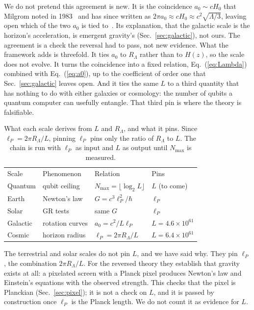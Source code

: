 \documentclass[aps,prd,twocolumn,superscriptaddress,nofootinbib,showkeys]{revtex4-2}
\begin{document}
We do not pretend this agreement is new. It is the coincidence $a_0\sim cH_0$ that Milgrom noted in 1983~\cite{milgrom1983} and has since written as $2\pi a_0\approx cH_0\approx c^2\sqrt{\Lambda/3}$, leaving open which of the two $a_0$ is tied to~\cite{milgrom2020}. Its explanation, that the galactic scale is the horizon's acceleration, is emergent gravity's (Sec.~\ref{sec:galactic}), not ours. The agreement is a check the reversal had to pass, not new evidence. What the framework adds is threefold. It ties $a_0$ to $R_\Lambda$ rather than to $H(z)$, so the scale does not evolve. It turns the coincidence into a fixed relation, Eq.~(\ref{eq:Lambda}) combined with Eq.~(\ref{eq:a0}), up to the coefficient of order one that Sec.~\ref{sec:galactic} leaves open. And it ties the same $L$ to a third quantity that has nothing to do with either galaxies or cosmology: the number of qubits a quantum computer can usefully entangle. That third pin is where the theory is falsifiable.

\begin{table}[t]
\caption{What each scale derives from $L$ and $R_\Lambda$, and what it pins. Since $\ell_P = 2\pi R_\Lambda/L$, pinning $\ell_P$ pins only the ratio of $R_\Lambda$ to $L$. The chain is run with $\ell_P$ as input and $L$ as output until $N_{\max}$ is measured.}
\label{tab:pins}
\begin{ruledtabular}
\small\setlength{\tabcolsep}{2pt}
\begin{tabular}{llll}
Scale & Phenomenon & Relation & Pins \\
\colrule
Quantum & qubit ceiling & $N_{\max}=\lfloor\log_2L\rfloor$ & $L$ (to come) \\
Earth & Newton's law & $G=c^3\ell_P^2/\hbar$ & $\ell_P$ \\
Solar & GR tests & same $G$ & $\ell_P$ \\
Galactic & rotation curves & $a_0=c^2/L\ell_P$ & $L=4.6\!\times\!10^{61}$ \\
Cosmic & horizon radius & $\ell_P=2\pi R_\Lambda/L$ & $L=6.4\!\times\!10^{61}$ \\
\end{tabular}
\end{ruledtabular}
\end{table}

The terrestrial and solar scales do not pin $L$, and we have said why. They pin $\ell_P$, the combination $2\pi R_\Lambda/L$. For the reversed theory they establish that gravity exists at all: a pixelated screen with a Planck pixel produces Newton's law and Einstein's equations with the observed strength. This checks that the pixel is Planckian (Sec.~\ref{sec:pixel}); it is not a check on $L$, and it is passed by construction once $\ell_P$ is the Planck length. We do not count it as evidence for $L$.
\end{document}
